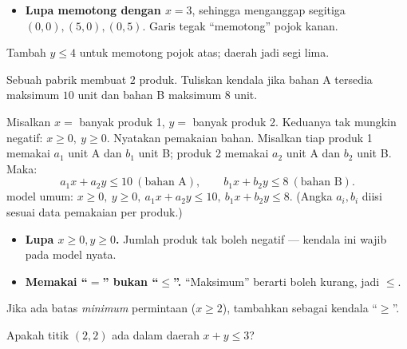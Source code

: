 \begin{jebakan}
\begin{itemize}[leftmargin=*,topsep=2pt]
  \item \textbf{Lupa memotong dengan $x=3$}, sehingga menganggap segitiga
  $(0,0),(5,0),(0,5)$. Garis tegak ``memotong'' pojok kanan.
\end{itemize}
\end{jebakan}

\begin{variasi}
Tambah $y\le4$ untuk memotong pojok atas; daerah jadi segi lima.
\end{variasi}

\begin{soalbox}{}
Sebuah pabrik membuat $2$ produk. Tuliskan kendala jika bahan A tersedia
maksimum $10$ unit dan bahan B maksimum $8$ unit.
\end{soalbox}

\jawab
{} Misalkan $x=$ banyak produk 1, $y=$ banyak produk 2. Keduanya tak
mungkin negatif: $x\ge0,\ y\ge0$.
 Nyatakan pemakaian bahan. Misalkan tiap produk 1 memakai $a_1$ unit A
dan $b_1$ unit B; produk 2 memakai $a_2$ unit A dan $b_2$ unit B. Maka:
\[
a_1x+a_2y\le10\ (\text{bahan A}),\qquad b_1x+b_2y\le8\ (\text{bahan B}).
\]
\jadi model umum: $x\ge0,\ y\ge0,\ a_1x+a_2y\le10,\ b_1x+b_2y\le8$.
(Angka $a_i,b_i$ diisi sesuai data pemakaian per produk.)

\begin{jebakan}
\begin{itemize}[leftmargin=*,topsep=2pt]
  \item \textbf{Lupa $x\ge0,y\ge0$.} Jumlah produk tak boleh negatif --- kendala
  ini wajib pada model nyata.
  \item \textbf{Memakai ``$=$'' bukan ``$\le$''.} ``Maksimum'' berarti boleh
  kurang, jadi $\le$.
\end{itemize}
\end{jebakan}

\begin{variasi}
Jika ada batas \emph{minimum} permintaan ($x\ge2$), tambahkan sebagai kendala
``$\ge$''.
\end{variasi}

\begin{soalbox}{}
Apakah titik $(2,2)$ ada dalam daerah $x+y\le3$?
\end{soalbox}

